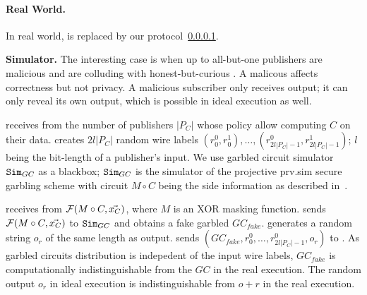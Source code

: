 \paragraph{Real World.} In real world, \F is replaced by our protocol~\ref{}.

\noindent\textbf{Simulator.}
%
%
%
%
%
%
%
The interesting case is when up to all-but-one publishers are malicious and are
colluding with honest-but-curious \broker. A malicous \broker affects
correctness but not privacy. A malicious subscriber only receives output; it
can only reveal its own output, which is possible in ideal execution as well.

\Sim receives from \F the number of publishers $|P_C|$ whose policy allow
computing $C$ on their data. \Sim creates $2l|P_C|$ random wire labels $(r_0^0,
r_0^1), \ldots, (r_{2l|P_C|-1}^0 ,r_{2l|P_C|-1}^1)$; $l$ being the bit-length
of a publisher's input. We use garbled circuit simulator $\texttt{Sim}_{GC}$ as a
blackbox; $\texttt{Sim}_{GC}$ is the simulator of the projective prv.sim secure
garbling scheme with circuit $M \circ C$ being the side information as
described in~\cite{}. 

\Sim receives from \F $\mathcal{F}(M \circ C, \vec{x_C})$, where $M$ is an XOR masking
function. \Sim sends $\mathcal{F}(M \circ C, \vec{x_C})$ to $\texttt{Sim}_{GC}$ and obtains a
fake garbled $GC_{fake}$. \Sim generates a random string $o_r$ of the same
length as output. \Sim sends $(GC_{fake}, r_0^0, \ldots, r_{2l|P_C|-1}^0, o_r)$
to \Adv. As garbled circuits distribution is indepedent of the input wire
labels, $GC_{fake}$ is computationally indistinguishable from the $GC$ in the
real execution. The random output $o_r$ in ideal execution is indistinguishable
from $o+r$ in the real execution.

